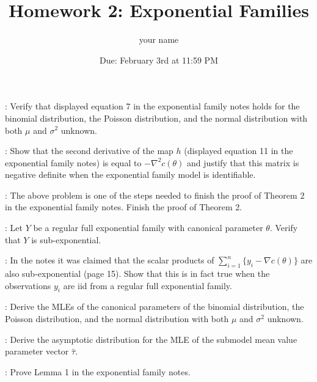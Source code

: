 \documentclass[12pt]{article}
\title{Homework 2: Exponential Families}
\author{your name}
\date{Due: February 3rd at 11:59 PM}
\begin{document}
\maketitle


: Verify that displayed equation 7 in the exponential family notes holds for the binomial distribution, the Poisson distribution, and the normal distribution with both $\mu$ and $\sigma^2$ unknown.

\vspace*{1cm}

: Show that the second derivative of the map $h$ (displayed equation 11 in the exponential family notes) is equal to $-\nabla^2 c(\theta)$ and justify that this matrix is negative definite when the exponential family model is identifiable.

\vspace*{1cm}

: The above problem is one of the steps needed to finish the proof of Theorem 2 in the exponential family notes. Finish the proof of Theorem 2.

\vspace*{1cm}

: Let $Y$ be a regular full exponential family with canonical parameter $\theta$. Verify that $Y$ is sub-exponential.

\vspace*{1cm}

: In the notes it was claimed that the scalar products of $\sum_{i=1}^n\{y_i - \nabla c(\theta)\}$ are also sub-exponential (page 15). Show that this is in fact true when the observations $y_i$ are iid from a regular full exponential family.

\vspace*{1cm}

: Derive the MLEs of the canonical parameters of the binomial distribution, the Poisson distribution, and the normal distribution with both $\mu$ and $\sigma^2$ unknown.

\vspace*{1cm}

: Derive the asymptotic distribution for the MLE of the submodel mean value parameter vector $\hat\tau$.

\vspace*{1cm}

: Prove Lemma 1 in the exponential family notes.

\vspace*{1cm}
\end{document}
